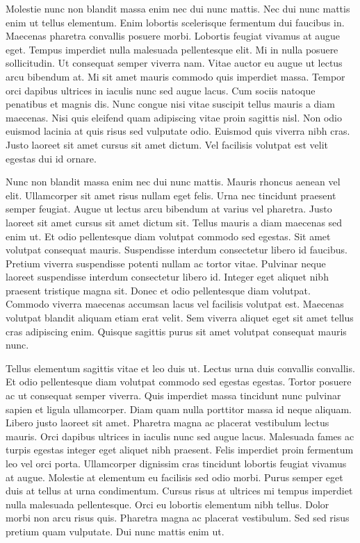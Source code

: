 \documentclass[11pt,a4paper]{article}
\begin{document}
Molestie nunc non blandit massa enim nec dui nunc mattis. Nec dui nunc mattis enim ut tellus elementum. Enim lobortis scelerisque fermentum dui faucibus in. Maecenas pharetra convallis posuere morbi. Lobortis feugiat vivamus at augue eget. Tempus imperdiet nulla malesuada pellentesque elit. Mi in nulla posuere sollicitudin. Ut consequat semper viverra nam. Vitae auctor eu augue ut lectus arcu bibendum at. Mi sit amet mauris commodo quis imperdiet massa. Tempor orci dapibus ultrices in iaculis nunc sed augue lacus. Cum sociis natoque penatibus et magnis dis. Nunc congue nisi vitae suscipit tellus mauris a diam maecenas. Nisi quis eleifend quam adipiscing vitae proin sagittis nisl. Non odio euismod lacinia at quis risus sed vulputate odio. Euismod quis viverra nibh cras. Justo laoreet sit amet cursus sit amet dictum. Vel facilisis volutpat est velit egestas dui id ornare.

Nunc non blandit massa enim nec dui nunc mattis. Mauris rhoncus aenean vel elit. Ullamcorper sit amet risus nullam eget felis. Urna nec tincidunt praesent semper feugiat. Augue ut lectus arcu bibendum at varius vel pharetra. Justo laoreet sit amet cursus sit amet dictum sit. Tellus mauris a diam maecenas sed enim ut. Et odio pellentesque diam volutpat commodo sed egestas. Sit amet volutpat consequat mauris. Suspendisse interdum consectetur libero id faucibus. Pretium viverra suspendisse potenti nullam ac tortor vitae. Pulvinar neque laoreet suspendisse interdum consectetur libero id. Integer eget aliquet nibh praesent tristique magna sit. Donec et odio pellentesque diam volutpat. Commodo viverra maecenas accumsan lacus vel facilisis volutpat est. Maecenas volutpat blandit aliquam etiam erat velit. Sem viverra aliquet eget sit amet tellus cras adipiscing enim. Quisque sagittis purus sit amet volutpat consequat mauris nunc.

Tellus elementum sagittis vitae et leo duis ut. Lectus urna duis convallis convallis. Et odio pellentesque diam volutpat commodo sed egestas egestas. Tortor posuere ac ut consequat semper viverra. Quis imperdiet massa tincidunt nunc pulvinar sapien et ligula ullamcorper. Diam quam nulla porttitor massa id neque aliquam. Libero justo laoreet sit amet. Pharetra magna ac placerat vestibulum lectus mauris. Orci dapibus ultrices in iaculis nunc sed augue lacus. Malesuada fames ac turpis egestas integer eget aliquet nibh praesent. Felis imperdiet proin fermentum leo vel orci porta. Ullamcorper dignissim cras tincidunt lobortis feugiat vivamus at augue. Molestie at elementum eu facilisis sed odio morbi. Purus semper eget duis at tellus at urna condimentum. Cursus risus at ultrices mi tempus imperdiet nulla malesuada pellentesque. Orci eu lobortis elementum nibh tellus. Dolor morbi non arcu risus quis. Pharetra magna ac placerat vestibulum. Sed sed risus pretium quam vulputate. Dui nunc mattis enim ut.
\end{document}
